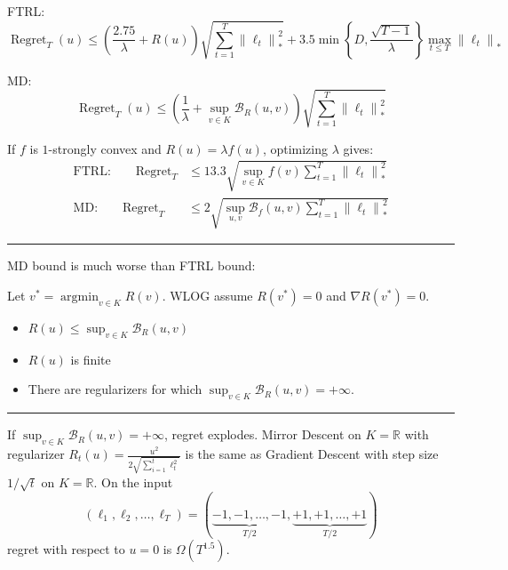 \documentclass[largefonts,landscape]{sciposter}
\DeclareMathOperator{\Regret}{Regret}
\DeclareMathOperator*{\argmin}{argmin}
\newcommand{\R}{\mathbb{R}}
\newcommand{\norm}[1]{\left\|#1\right\|}
\newcommand{\grad}{\nabla}
\newcommand{\Breg}{\mathcal{B}}
\begin{document}
\begin{multicols}{3}
\begin{minipage}{1.0\linewidth}
FTRL:
$$
\Regret_T(u) \le \left(\frac{2.75}{\lambda} + R(u)\right) \sqrt{\sum_{t=1}^T \norm{\ell_t}_*^2} + 3.5 \min \left\{ D, \frac{\sqrt{T-1}}{\lambda} \right\} \max_{t \le T} \norm{\ell_t}_*
$$

MD:
$$
\Regret_T(u) \le \left(\frac{1}{\lambda} + \sup_{v \in K} \Breg_{R}(u,v) \right) \sqrt{\sum_{t=1}^T \norm{\ell_t}_*^2}
$$

If $f$ is $1$-strongly convex and $R(u) = \lambda f(u)$, optimizing $\lambda$ gives:
\begin{align*}
\text{FTRL:} \qquad \Regret_T & \le 13.3 \sqrt{ \sup_{v \in K} f(v) \sum_{t=1}^T \norm{\ell_t}_*^2} \\
\text{MD:} \qquad \Regret_T & \le 2 \sqrt{ \sup_{u,v} \Breg_{f}(u,v) \sum_{t=1}^T \norm{\ell_t}_*^2}
\end{align*}
\end{minipage}

\vspace{0.6cm}

\hrule height 3pt

\vspace{0.6cm}


\begin{minipage}{1.0\linewidth}
MD bound is much worse than FTRL bound:

Let $v^* = \argmin_{v \in K} R(v)$.
WLOG assume $R(v^*) = 0$ and $\grad R(v^*) = 0$.

\begin{itemize}
\item $R(u) \le \sup_{v \in K} \Breg_{R}(u,v)$
\item $R(u)$ is finite
\item There are regularizers for which $\sup_{v \in K} \Breg_{R}(u,v) = + \infty$.
\end{itemize}
\end{minipage}

\vspace{0.6cm}

\hrule height 3pt

\vspace{0.6cm}

\begin{minipage}{1.0\linewidth}
\noindent
If $\sup_{v \in K} \Breg_{R}(u,v) = +\infty$, regret explodes.
Mirror Descent on $K=\R$ with regularizer $R_t(u) = \frac{u^2}{2 \sqrt{\sum_{i=1}^t \ell_t^2}}$
is the same as Gradient Descent with step size $1/\sqrt{t}$ on $K=\R$.
On the input
$$
(\ell_1, \ell_2, \dots, \ell_T) = (\underbrace{-1, -1, \dots, -1}_{T/2}, \underbrace{+1, +1, \dots, +1}_{T/2})
$$
regret with respect to $u=0$ is $\Omega(T^{1.5})$.
\end{minipage}


\end{multicols}
\end{document}
